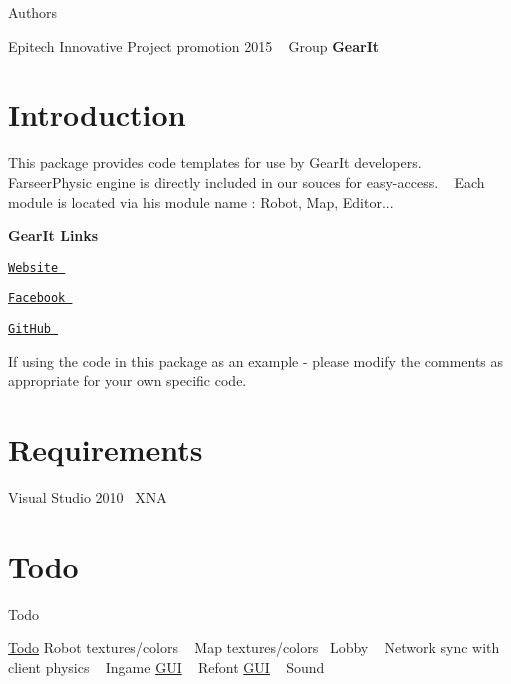 \begin{DoxyAuthor}{Authors}

\end{DoxyAuthor}
Epitech Innovative Project promotion 2015 ~\newline
 Group {\bfseries Gear\+It}\hypertarget{index_intro}{}\section{Introduction}\label{index_intro}
This package provides code templates for use by Gear\+It developers. ~\newline
 Farseer\+Physic engine is directly included in our souces for easy-\/access. ~\newline
 Each module is located via his module name \+: Robot, Map, Editor...

{\bfseries Gear\+It Links}
\begin{DoxyItemize}
\item \href{http://eip.epitech.eu/2015/gearit/}{\tt Website }
\item \href{https://www.facebook.com/pages/Gear-it/274074276087936}{\tt Facebook }
\item \href{https://github.com/Yax42/gearit/}{\tt Git\+Hub }
\end{DoxyItemize}

If using the code in this package as an example -\/ please modify the comments as appropriate for your own specific code.



 \hypertarget{index_requirements}{}\section{Requirements}\label{index_requirements}
Visual Studio 2010~\newline
 X\+N\+A 

 \hypertarget{index_todo}{}\section{Todo}\label{index_todo}
\begin{DoxyRefDesc}{Todo}
\item[\hyperlink{todo__todo000001}{Todo}]Robot textures/colors ~\newline
 Map textures/colors~\newline
 Lobby ~\newline
 Network sync with client physics ~\newline
 Ingame \hyperlink{namespace_g_u_i}{G\+U\+I} ~\newline
 Refont \hyperlink{namespace_g_u_i}{G\+U\+I} ~\newline
 Sound ~\newline
 \end{DoxyRefDesc}


